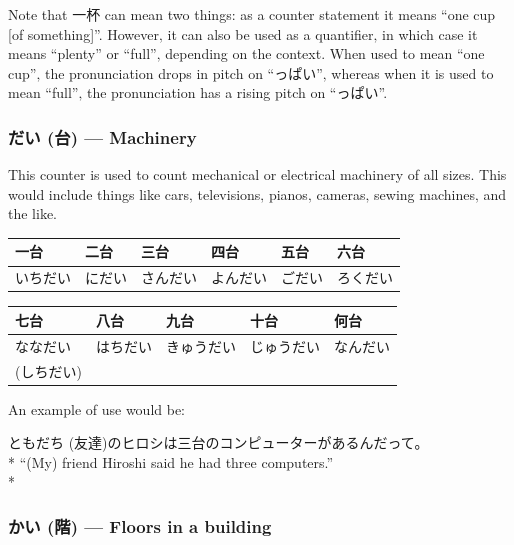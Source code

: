 \documentclass[11pt, b5paper, twoside, openright, onecolumn]{book}
\makeatletter
\newcommand*{\rubystack}[2]{{\relscale{0.5}%
  \begin{tabular}[b]{@{}c@{}}%
    {#1}\\%
   {\textscale{2}{#2}}%
  \end{tabular}}%
}
\DeclareRobustCommand*{\ruby}[2]{%
  \mbox{%
    \setlength{\parskip}{0ex}%
    \BeginAccSupp{method=pdfstringdef,ActualText={#1}}%
      \rubystack{\phantom{#2}}{#1}%
      \llap{%
        \rubystack{#2}{\phantom{#1}}%
      }%
    \EndAccSupp{}%
  }%
}
\renewcommand*{\ruby}[2]{#2 (#1)}%
\newenvironment{exampleblock}{
\setlength{\parindent}{0.6in}
\begin{minipage}[t]{\dimexpr\textwidth-\parindent}}
{\end{minipage}}
\newenvironment{mytabular}[1]{\noindent\hspace{0.4in}
\begin{tabular}[h]{#1}}{\end{tabular}}
\makeatother
\begin{document}
Note that 一杯 can mean two things: as a counter statement it means “one cup [of something]”. However‚ it can also be used as a quantifier‚ in which case it means “plenty” or “full”‚ depending on the context. When used to mean “one cup”‚ the pronunciation drops in pitch on “っぱい”‚ whereas when it is used to mean “full”‚ the pronunciation has a rising pitch on “っぱい”.

\subsubsection{\ruby{台}{だい} — Machinery}

This counter is used to count mechanical or electrical machinery of all sizes. This would include things like cars‚ televisions‚ pianos‚ cameras‚ sewing machines‚ and the like.

\vspace{0.5cm}
\smaller
\begin{mytabular}{| l  l  l  l  l  l |}\hline 
\rule{0pt}{2.4ex}一台 & 二台 & 三台 & 四台 & 五台 & 六台\\ 
\hline
\rule{0pt}{2.4ex}いちだい & にだい & さんだい & よんだい & ごだい & ろくだい\\ 
\hline 
\end{mytabular}
\larger
\vspace{0.5cm}

\smaller
\begin{mytabular}{| l  l  l  l  l |}\hline 
\rule{0pt}{2.4ex}七台 & 八台 & 九台 & 十台 & 何台\\ 
\hline
\rule{0pt}{2.4ex}ななだい & はちだい & きゅうだい & じゅうだい & なんだい\\ 
\rule{0pt}{2.4ex}(しちだい) &  &  &  & \\ 
\hline 
\end{mytabular}
\larger
\vspace{0.5cm}


An example of use would be:

\vspace{0.4cm}
\begin{exampleblock}
\ruby{友達}{ともだち}のヒロシは三台のコンピューターがあるんだって。 \\* 
“(My) friend Hiroshi said he had three computers.” \\* 
\end{exampleblock}
\subsubsection{\ruby{階}{かい} — Floors in a building}
\end{document}
